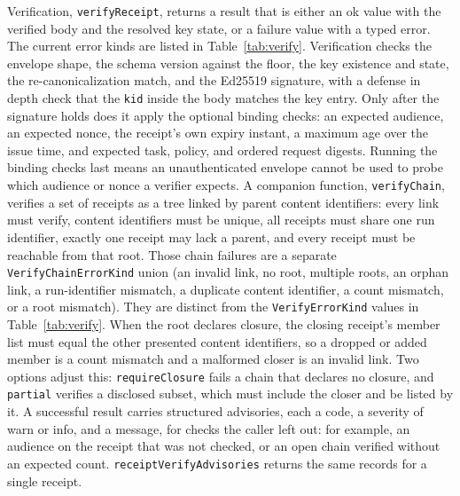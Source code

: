 \documentclass[conference]{IEEEtran}
\newcommand{\code}[1]{\texttt{\small #1}}
\begin{document}
Verification, \code{verifyReceipt}, returns a result that is either an ok value with
the verified body and the resolved key state, or a failure value with a typed error.
The current error kinds are listed in Table~\ref{tab:verify}. Verification
checks the envelope shape, the schema version against the floor, the key existence
and state, the re-canonicalization match, and the Ed25519 signature, with a defense in
depth check that the \code{kid} inside the body matches the key entry. Only after the
signature holds does it apply the optional binding checks: an expected audience, an
expected nonce, the receipt's own expiry instant, a maximum age over the issue
time, and expected task, policy, and ordered request digests. Running the binding checks last means an unauthenticated envelope cannot be
used to probe which audience or nonce a verifier expects. A companion function,
\code{verifyChain}, verifies a set of receipts as a tree linked by parent content
identifiers: every link must verify, content identifiers must be unique, all receipts
must share one run identifier, exactly one receipt may lack a parent, and every
receipt must be reachable from that root. Those chain failures are a separate
\code{VerifyChainErrorKind} union (an invalid link, no root, multiple roots, an orphan
link, a run-identifier mismatch, a duplicate content identifier, a count mismatch, or a
root mismatch). They are distinct from the \code{VerifyErrorKind} values in
Table~\ref{tab:verify}. When the root declares closure, the closing receipt's member
list must equal the other presented content identifiers, so a dropped or added member
is a count mismatch and a malformed closer is an invalid link. Two options adjust this:
\code{requireClosure} fails a chain that declares no closure, and \code{partial}
verifies a disclosed subset, which must include the closer and be listed by it. A
successful result carries structured advisories, each a code, a severity of warn or
info, and a message, for checks the caller left out: for example, an audience on the
receipt that was not checked, or an open chain verified without an expected count.
\code{receiptVerifyAdvisories} returns the same records for a single receipt.
\end{document}

